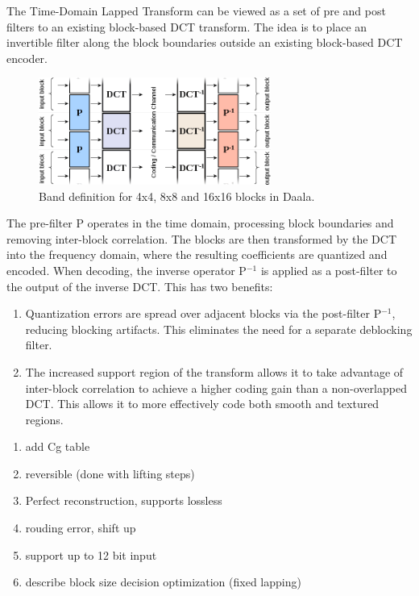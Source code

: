 \documentclass[conference, 10pt]{IEEEtran}
\begin{document}
The Time-Domain Lapped Transform can be viewed as a set of pre and post
 filters to an existing block-based DCT transform.
The idea is to place an invertible filter along the block boundaries outside
 an existing block-based DCT encoder.

\begin{figure}[h]
\begin{center}
\noindent
  \includegraphics[natwidth=876,natheight=314,width=3in]{lapping.png}
  \caption{Band definition for 4x4, 8x8 and 16x16 blocks in Daala.}\label{fig:bands}
\end{center}
\end{figure}

The pre-filter P operates in the time domain, processing block boundaries and
 removing inter-block correlation.
The blocks are then transformed by the DCT into the frequency domain, where
 the resulting coefficients are quantized and encoded.
When decoding, the inverse operator P$^{-1}$ is applied as a post-filter to
 the output of the inverse DCT.
This has two benefits:

\begin{enumerate}
\item Quantization errors are spread over adjacent blocks via the post-filter
 P$^{-1}$, reducing blocking artifacts.
This eliminates the need for a separate deblocking filter.
\item The increased support region of the transform allows it to take
 advantage of inter-block correlation to achieve a higher coding gain than a
 non-overlapped DCT.  This allows it to more effectively code both smooth and
 textured regions.
\end{enumerate}

\begin{enumerate}
\item add Cg table
\item reversible (done with lifting steps)
\item Perfect reconstruction, supports lossless
\item rouding error, shift up
\item support up to 12 bit input
\item describe block size decision optimization (fixed lapping)
\end{enumerate}
\end{document}
